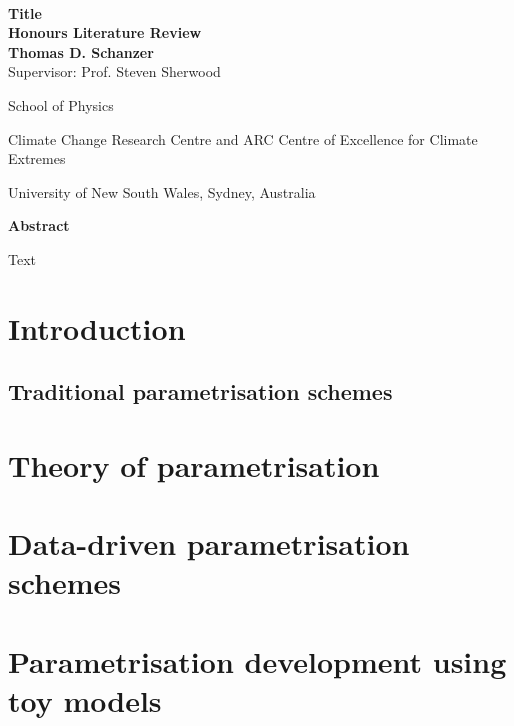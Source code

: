 \documentclass[titlepage]{article}
\numberwithin{equation}{section}
\begin{document}
\begin{titlepage}
\vfill~

\begin{center}
    {\Huge \textbf{%
        Title
    }} \\
    \vspace{0.75cm}
    {\Large\textbf{Honours Literature Review}} \\
    \vspace{0.75cm}
    {\Large\textbf{Thomas D. Schanzer}} \\
    \vspace{6pt}
    {\large Supervisor: Prof. Steven Sherwood} \\
    \vspace{0.75cm}
    {\large%
        School of Physics

        Climate Change Research Centre and
        ARC Centre of Excellence for Climate Extremes

        University of New South Wales, Sydney, Australia
    }
\end{center}
\vfill
\begin{center}
{\large\textbf{Abstract}}

\begin{minipage}{13cm}
    Text
\end{minipage}
\end{center}
\vfill
\end{titlepage}

\newpage
\tableofcontents

\newpage
\pagestyle{fancy}
\thispagestyle{fancy}

\section{Introduction}
\subsection{Traditional parametrisation schemes}

\newpage
\section{Theory of parametrisation}

\newpage
\section{Data-driven parametrisation schemes}

\newpage
\section{Parametrisation development using toy models}
\end{document}
